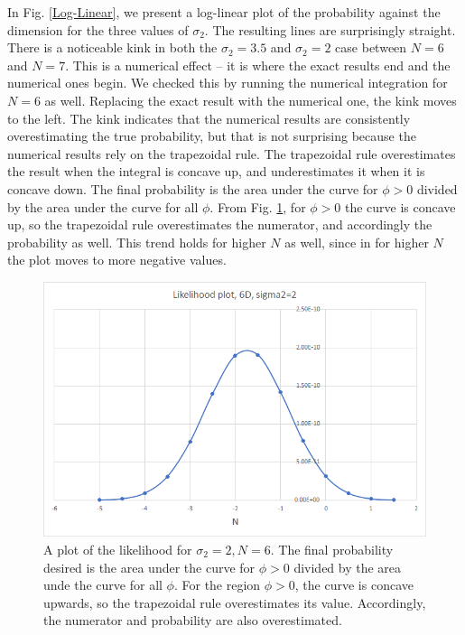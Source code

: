 \documentclass[12pt]{article}
\begin{document}
In Fig. \ref{Log-Linear}, we present a log-linear plot of the probability against the dimension for the three values of $\sigma_2$. The resulting lines are surprisingly straight. There is a noticeable kink in both the $\sigma_2 = 3.5$ and $\sigma_2=2$ case between $N=6$ and $N=7$. This is a numerical effect -- it is where the exact results end and the numerical ones begin. We checked this by running the numerical integration for $N=6$ as well. Replacing the exact result with the numerical one, the kink moves to the left. The kink indicates that the numerical results are consistently overestimating the true probability, but that is not surprising because the numerical results rely on the trapezoidal rule. The trapezoidal rule overestimates the result when the integral is concave up, and underestimates it when it is concave down. The final probability is the area under the curve for $\phi > 0$ divided by the area under the curve for all $\phi$. From Fig. \ref{Likelihood}, for $\phi > 0$ the curve is concave up, so the trapezoidal rule overestimates the numerator, and accordingly the probability as well. This trend holds for higher $N$ as well, since in for higher $N$ the plot moves to more negative values.

\begin{figure}
  \centering
  \includegraphics[width=\linewidth]{LikelihoodPlot.png}
  \caption{A plot of the likelihood for $\sigma_2=2, N=6$. The final probability desired is the area under the curve for $\phi > 0$ divided by the area unde the curve for all $\phi$. For the region $\phi > 0$, the curve is concave upwards, so the trapezoidal rule overestimates its value. Accordingly, the numerator and probability are also overestimated.}
  \label{Likelihood}
\end{figure}
\end{document}
